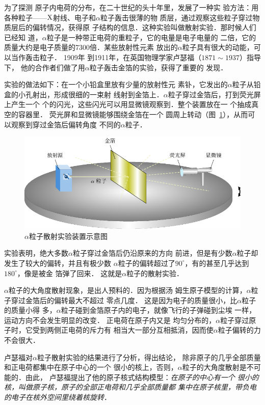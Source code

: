为了探测
原子内电荷的分布，在二十世纪的头十年里，发展了一种实
验方法：用各种粒子——$\rm{X}$射线、电子和$\alpha$粒子轰击很薄的物
质层，通过观察这些粒子穿过物质层后的偏转情况，获得原
子结构的信息．这种实验叫做散射实验．那时候人们已经知
道，$\alpha$粒子是一种带正电荷的重粒子，它的电量是电子电量的
二倍，它的质量大约是电子质量的7300倍．某些放射性元素
放出的$\alpha$粒子具有很大的动能，可以当作轰击粒子．
1909年
到1911年，在英国物理学家卢瑟福（$1871 \sim 1937$）指导下，
他的合作者们做了用$\alpha$粒子轰击金箔的实验，获得了重要的
发现．

实验的做法如下：在一个小铅盒里放有少量的放射性元
素钋，它发出的$\alpha$粒子从铅盒的小孔射出，形成很细的一束射
线射到金箔上．$\alpha$粒子穿过金箔后，打到荧光屏上产生一个
个的闪光，这些闪光可以用显微镜观察到．整个装置放在一
个抽成真空的容器里．
荧光屏和显微镜能够围绕金箔在一个
圆周上转动（图~\ref{fig_C_8-2}），从而可以观察到穿过金箔后偏转角度
不同的$\alpha$粒子．
\begin{figure}[htbp]
    \centering
    \includegraphics{fig/C/8-2.pdf}
    \caption{$\alpha$粒子散射实验装置示意图}\label{fig_C_8-2}
\end{figure}

实验表明，绝大多数$\alpha$粒子穿过金箔后仍沿原来的方向
前进，但是有少数$\alpha$粒子却发生了较大的偏转，并且有极少数
$\alpha$粒子的偏转超过了$90^{\circ}$，有的甚至几乎达到$180^{\circ}$，像是被金
箔弹了回来．
这就是$\alpha$粒子的散射实验．

$\alpha$粒子的大角度散射现象，是出人预料的．因为根据汤
姆生原子模型的计算，$\alpha$粒子穿过金箔后的偏转最大不超过
零点几度．
这是因为电子的质量很小，比$\alpha$粒子的质量小得
多，$\alpha$粒子碰到金箔原子内的电子，就像飞行的子弹碰到尘埃
一样，运动方向不会发生明显的改变．
正电荷在原子内又是
均匀分布的，$\alpha$粒子穿过原子时，它受到两侧正电荷的斥力有
相当大一部分互相抵消，因而使$\alpha$粒子偏转的力不会很大．

卢瑟福对$\alpha$粒子散射实验的结果进行了分析，得出结论，
除非原子的几乎全部质量和正电荷都集中在原子中心的一个
很小的核上，否则，$\alpha$粒子的大角度散射是不可能的．由此，
卢瑟福提出了他的原子核式结构模型：\textit{在原子的中心有一个
很小的核，叫做原子核，原子的全部正电荷和几乎全部质量都
集中在原子核里，带负电的电子在核外空间里绕着核旋转}．

